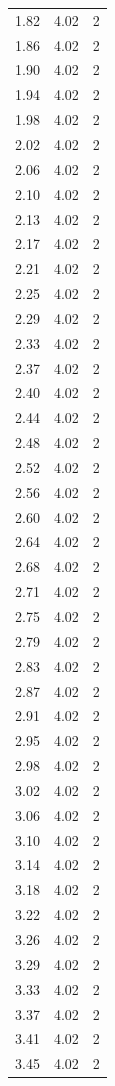 \begin{longtable}{lrr}
  1.82 & 4.02 & 2 \\
  1.86 & 4.02 & 2 \\
  1.90 & 4.02 & 2 \\
  1.94 & 4.02 & 2 \\
  1.98 & 4.02 & 2 \\
  2.02 & 4.02 & 2 \\
  2.06 & 4.02 & 2 \\
  2.10 & 4.02 & 2 \\
  2.13 & 4.02 & 2 \\
  2.17 & 4.02 & 2 \\
  2.21 & 4.02 & 2 \\
  2.25 & 4.02 & 2 \\
  2.29 & 4.02 & 2 \\
  2.33 & 4.02 & 2 \\
  2.37 & 4.02 & 2 \\
  2.40 & 4.02 & 2 \\
  2.44 & 4.02 & 2 \\
  2.48 & 4.02 & 2 \\
  2.52 & 4.02 & 2 \\
  2.56 & 4.02 & 2 \\
  2.60 & 4.02 & 2 \\
  2.64 & 4.02 & 2 \\
  2.68 & 4.02 & 2 \\
  2.71 & 4.02 & 2 \\
  2.75 & 4.02 & 2 \\
  2.79 & 4.02 & 2 \\
  2.83 & 4.02 & 2 \\
  2.87 & 4.02 & 2 \\
  2.91 & 4.02 & 2 \\
  2.95 & 4.02 & 2 \\
  2.98 & 4.02 & 2 \\
  3.02 & 4.02 & 2 \\
  3.06 & 4.02 & 2 \\
  3.10 & 4.02 & 2 \\
  3.14 & 4.02 & 2 \\
  3.18 & 4.02 & 2 \\
  3.22 & 4.02 & 2 \\
  3.26 & 4.02 & 2 \\
  3.29 & 4.02 & 2 \\
  3.33 & 4.02 & 2 \\
  3.37 & 4.02 & 2 \\
  3.41 & 4.02 & 2 \\
  3.45 & 4.02 & 2 \\

\end{longtable}
